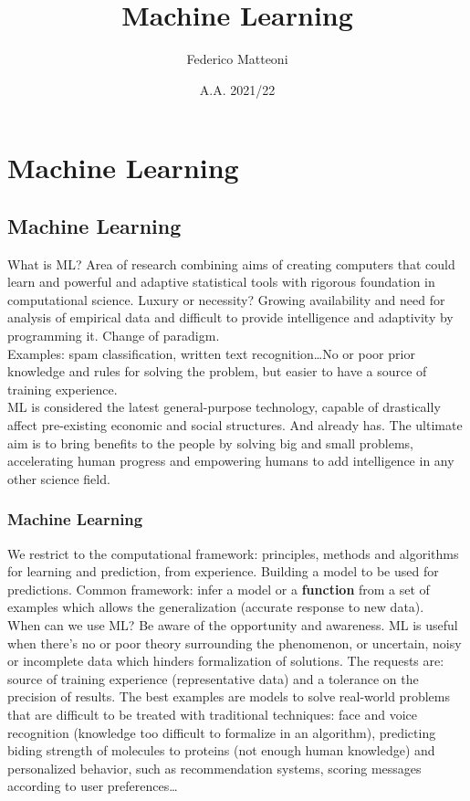 \documentclass[10pt]{report}
\begin{document}
\title{Machine Learning}
\author{Federico Matteoni}
\date{A.A. 2021/22}
\renewcommand*\contentsname{Index}

\maketitle
\begin{multicols}{2}
\tableofcontents
\end{multicols}
\pagebreak
\chapter{Machine Learning}
\section{Machine Learning}
What is ML? Area of research combining aims of creating computers that could learn and powerful and adaptive statistical tools with rigorous foundation in computational science. Luxury or necessity? Growing availability and need for analysis of empirical data and difficult to provide intelligence and adaptivity by programming it. Change of paradigm.\\
Examples: spam classification, written text recognition\ldots No or poor prior knowledge and rules for solving the problem, but easier to have a source of training experience.\\
ML is considered the latest general-purpose technology, capable of drastically affect pre-existing economic and social structures. And already has. The ultimate aim is to bring benefits to the people by solving big and small problems, accelerating human progress and empowering humans to add intelligence in any other science field.
\subsection{Machine Learning} We restrict to the computational framework: principles, methods and algorithms for learning and prediction, from experience. Building a model to be used for predictions. Common framework: infer a model or a \textbf{function} from a set of examples which allows the generalization (accurate response to new data).\\
When can we use ML? Be aware of the opportunity and awareness. ML is useful when there's no or poor theory surrounding the phenomenon, or uncertain, noisy or incomplete data which hinders formalization of solutions. The requests are: source of training experience (representative data) and a tolerance on the precision of results. The best examples are models to solve real-world problems that are difficult to be treated with traditional techniques: face and voice recognition (knowledge too difficult to formalize in an algorithm), predicting biding strength of molecules to proteins (not enough human knowledge) and personalized behavior, such as recommendation systems, scoring messages according to user preferences\ldots
\end{document}
